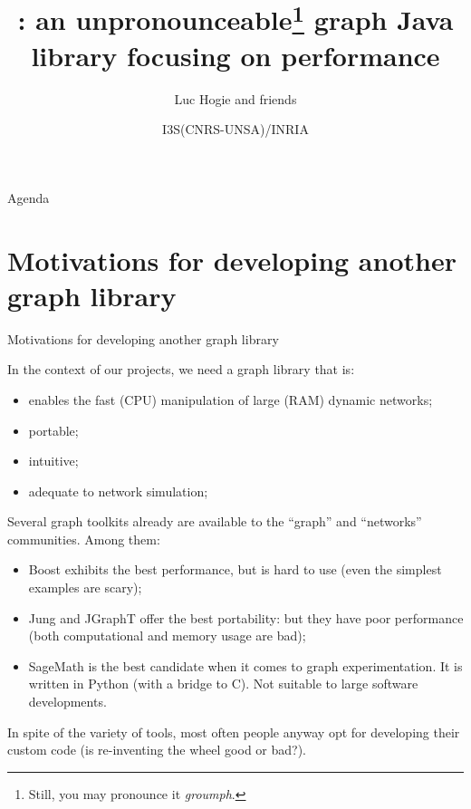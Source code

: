 \documentclass{beamer}
\title[\grph]{\grph: an unpronounceable\footnote{Still, you may pronounce it \textit{groumph}.} graph Java library focusing on  \alert{performance}}
\author{Luc Hogie and friends}
\date[2011]{I3S(\alert{CNRS}-UNSA)/INRIA}
\newcommand{\sectionti}[1]{{\Huge #1}}
\begin{document}
\begin{frame}
  \titlepage
\end{frame}

\begin{frame}{Agenda}

  \tableofcontents
\end{frame}


\section{Motivations for developing another graph library}
\begin{frame}
\sectionti{Motivations for developing  another  graph library}
\end{frame}

\begin{frame}
In the context of our projects, we need a graph library that is:
	  \begin{itemize}
  \item enables the \alert{fast} (CPU) manipulation of \alert{large} (RAM) dynamic networks;
  \item portable;
  \item intuitive;
  \item adequate to network simulation;
	  \end{itemize}
\end{frame}



\begin{frame}
	Several  graph toolkits already are available to the ``graph'' and ``networks'' communities. Among them:
	  \begin{itemize}
  \item \alert{Boost} exhibits the best performance, but is hard to use (even the simplest examples are scary);
  \item \alert{Jung and JGraphT} offer the best portability: but they have poor performance (both computational and memory usage are bad);
  \item \alert{SageMath} is the best candidate when it comes to graph experimentation. It is written in Python (with a bridge to C). Not suitable to large software developments.
	  \end{itemize}

In spite of the variety of tools, most often people anyway opt for developing their custom code (is re-inventing the wheel good or bad?).
\end{frame}
\end{document}
